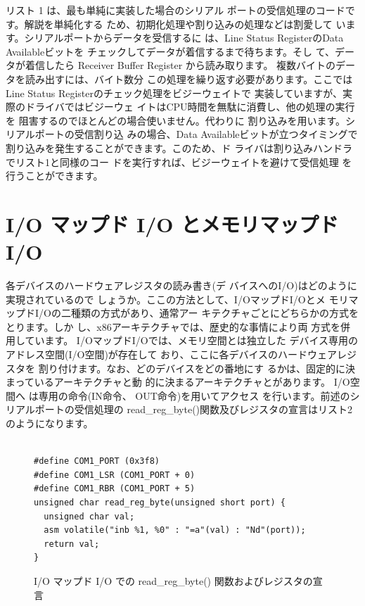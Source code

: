  リスト 1 は、最も単純に実装した場合のシリアル
ポートの受信処理のコードです。解説を単純化する
ため、初期化処理や割り込みの処理などは割愛して
います。シリアルポートからデータを受信するに
は、Line Status RegisterのData Availableビットを
チェックしてデータが着信するまで待ちます。そし
て、データが着信したら Receiver Buffer Register
から読み取ります。
 複数バイトのデータを読み出すには、バイト数分
この処理を繰り返す必要があります。ここではLine
Status Registerのチェック処理をビジーウェイトで
実装していますが、実際のドライバではビジーウェ
イトはCPU時間を無駄に消費し、他の処理の実行を
阻害するのでほとんどの場合使いません。代わりに
割り込みを用います。シリアルポートの受信割り込
みの場合、Data Availableビットが立つタイミングで
割り込みを発生することができます。このため、ド
ライバは割り込みハンドラでリスト1と同様のコー
ドを実行すれば、ビジーウェイトを避けて受信処理
を行うことができます。



\section{I/O マップド I/O とメモリマップド I/O}

 各デバイスのハードウェアレジスタの読み書き(デ
バイスへのI/O)はどのように実現されているので
しょうか。ここの方法として、I/OマップドI/Oとメ
モリマップドI/Oの二種類の方式があり、通常アー
キテクチャごとにどちらかの方式をとります。しか
し、x86アーキテクチャでは、歴史的な事情により両
方式を併用しています。
 I/OマップドI/Oでは、メモリ空間とは独立した
デバイス専用のアドレス空間(I/O空間)が存在して
おり、ここに各デバイスのハードウェアレジスタを
割り付けます。なお、どのデバイスをどの番地にす
るかは、固定的に決まっているアーキテクチャと動
的に決まるアーキテクチャとがあります。 I/O空間へ
は専用の命令(IN命令、 OUT命令)を用いてアクセス
を行います。前述のシリアルポートの受信処理の
read\_reg\_byte()関数及びレジスタの宣言はリスト2
のようになります。

\begin{figure}\centering
\begin{verbatim}

#define COM1_PORT (0x3f8)
#define COM1_LSR (COM1_PORT + 0)
#define COM1_RBR (COM1_PORT + 5)
unsigned char read_reg_byte(unsigned short port) {
  unsigned char val;
  asm volatile("inb %1, %0" : "=a"(val) : "Nd"(port));
  return val;
}
\end{verbatim}
\caption{I/O マップド I/O での read\_reg\_byte() 関数およびレジスタの宣言}
\end{figure}

